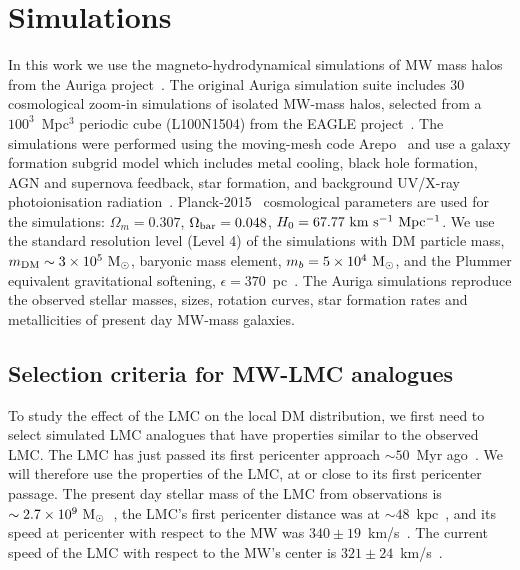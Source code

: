 \section{Simulations}
\label{sec: simulations}

In this work we use the magneto-hydrodynamical simulations of MW mass halos from the Auriga project~\citep{Grand:2016mgo}. The original Auriga simulation suite includes 30 cosmological zoom-in simulations of isolated MW-mass halos, selected from a $100^3$~Mpc$^3$ periodic cube (L100N1504) from the EAGLE project~\cite{Schaye2015,Crain2015}. The simulations were performed using the moving-mesh code Arepo~\citep{Springel2010} and use a galaxy formation subgrid model which includes metal cooling, black hole formation, AGN and supernova feedback, star formation, and background UV/X-ray photoionisation radiation~\cite{Grand:2016mgo}. Planck-2015~\citep{Planck:2015fie} cosmological parameters are used for the simulations: $\Omega_{m}=0.307$, $\Omega_{\rm bar}=0.048$, $H_0=67.77~{\rm km~s^{-1}~Mpc^{-1}}$. We use the standard resolution level (Level 4) of the simulations with DM particle mass, $m_{\rm DM} \sim 3\times 10^5~{\rm M}_\odot$, baryonic mass element, $m_b=5\times10^4~{\rm M}_\odot$, and the Plummer equivalent gravitational softening, $\epsilon=370$~pc~\citep{Power:2002sw,Jenkins2013}. The Auriga simulations reproduce the observed stellar masses, sizes, rotation curves, star formation rates and metallicities of present day MW-mass galaxies.




\subsection{Selection criteria for MW-LMC analogues}
\label{sec: selection criteria}



To study the effect of the LMC on the local DM distribution, we first need to select simulated LMC analogues that have properties similar to the observed LMC. The LMC has just passed its first pericenter approach $\sim 50$~Myr ago~\cite{Besla:2007kf}.  
We will therefore use the properties of the LMC, at or close to its first pericenter passage. 
The present day stellar mass of the LMC from observations is $\sim 2.7 \times 10^9~{\rm M}_\odot$~\cite{vanderMarel:2002kq}, the LMC's first pericenter distance was at $\sim 48$~kpc~\cite{Besla:2007kf}, and its speed at pericenter with respect to the MW was $340 \pm 19$~km/s~\cite{Salem_2015}. The current speed of the LMC with respect to the MW's center is $321 \pm 24$~km/s~\cite{Kallivayalil:2013xb}.


